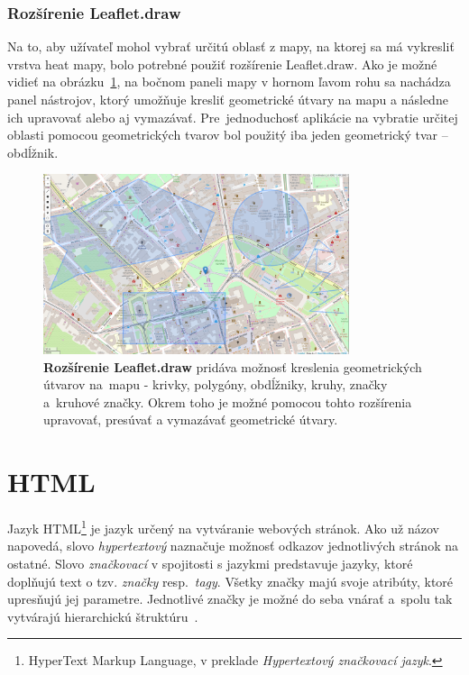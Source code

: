 \subsubsection{Rozšírenie Leaflet.draw}
Na to, aby užívateľ mohol vybrať určitú oblasť z mapy, na ktorej sa má vykresliť vrstva heat mapy, bolo potrebné použiť rozšírenie Leaflet.draw. Ako je možné vidieť na obrázku~\ref{fig:leafletdraw}, na bočnom paneli mapy v hornom ľavom rohu sa nachádza panel nástrojov, ktorý umožňuje kresliť geometrické útvary na mapu a následne ich upravovať alebo aj vymazávať. Pre~jednoduchosť aplikácie na vybratie určitej oblasti pomocou geometrických tvarov bol použitý iba jeden geometrický tvar \--- obdĺžnik.

\begin{figure}[ht]
    \centering
    \includegraphics[width=0.8\textwidth]{obrazky-figures/leaflet-draw-screenshot.png}
    \caption{\textbf{Rozšírenie Leaflet.draw} pridáva možnosť kreslenia geometrických útvarov na~mapu \-- krivky, polygóny, obdĺžniky, kruhy, značky a~kruhové značky. Okrem toho je možné pomocou tohto rozšírenia upravovať, presúvať a vymazávať geometrické útvary.}
    \label{fig:leafletdraw}
\end{figure}

\section{HTML}
Jazyk HTML\footnote{HyperText Markup Language, v preklade \emph{Hypertextový značkovací jazyk}.} je jazyk určený na vytváranie webových stránok. Ako už názov napovedá, slovo \emph{hypertextový} naznačuje možnosť odkazov jednotlivých stránok na ostatné. Slovo \emph{značkovací} v spojitosti s jazykmi predstavuje jazyky, ktoré doplňujú text o tzv. \emph{značky} resp.~\emph{tagy}. Všetky značky majú svoje atribúty, ktoré upresňujú jej parametre. Jednotlivé značky je možné do seba vnárať a~spolu tak vytvárajú hierarchickú štruktúru~\cite{kosek1998html}.


